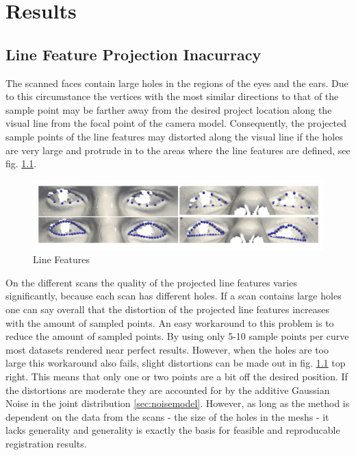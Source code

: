 \chapter{Results}
\label{chap:results}
\section{Line Feature Projection Inacurracy}
\label{sec:linefeature_inaccuracy}
The scanned faces contain large holes in the regions of the eyes and the ears. Due to this circumstance the vertices with the most similar directions to that of the sample point may be farther away from the desired project location along the visual line from the focal point of the camera model. 
Consequently, the projected sample points of the line features may distorted along the visual line if the holes are very large and protrude in to the areas where the line features are defined, see fig. \ref{fig:linefeature_comparison}. 
\begin{figure}[h!]
    \centering
    \includegraphics[width=\textwidth]{./resources/img/linefeatures_eyes.pdf}
    \caption{Line Features}
    \label{fig:linefeature_comparison}
\end{figure}
On the different scans the quality of the projected line features varies significantly, because each scan has different holes. If a scan contains large holes one can say overall that the distortion of the projected line features increases with the amount of sampled points. 
An easy workaround to this problem is to reduce the amount of sampled points. By using only 5-10 sample points per curve most datasets rendered near perfect results. 
However, when the holes are too large this workaround also fails, slight distortions can be made out in fig. \ref{fig:linefeature_comparison} top right. This means that only one or two points are a bit off the desired position.
If the distortions are moderate they are accounted for by the additive Gaussian Noise in the joint distribution \ref{sec:noisemodel}.
However, as long as the method is dependent on the data from the scans - the size of the holes in the meshs - it lacks generality and generality is exactly the basis for feasible and reproducable registration results.\\

